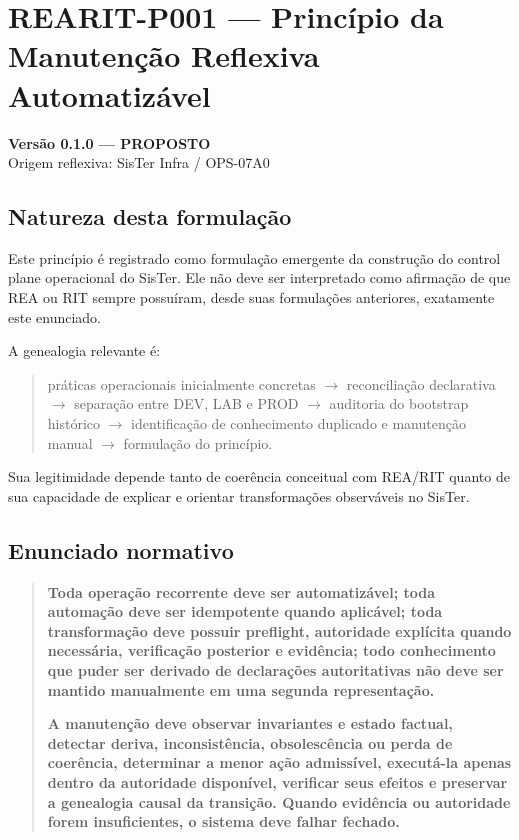 
\chapter{REARIT-P001 --- Princípio da Manutenção Reflexiva Automatizável}

\begin{center}
\textbf{Versão 0.1.0 --- PROPOSTO}\\
Origem reflexiva: SisTer Infra / OPS-07A0
\end{center}

\section{Natureza desta formulação}

Este princípio é registrado como formulação emergente da construção do control
plane operacional do SisTer. Ele não deve ser interpretado como afirmação de
que REA ou RIT sempre possuíram, desde suas formulações anteriores, exatamente
este enunciado.

A genealogia relevante é:

\begin{quote}
práticas operacionais inicialmente concretas
$\rightarrow$
reconciliação declarativa
$\rightarrow$
separação entre DEV, LAB e PROD
$\rightarrow$
auditoria do bootstrap histórico
$\rightarrow$
identificação de conhecimento duplicado e manutenção manual
$\rightarrow$
formulação do princípio.
\end{quote}

Sua legitimidade depende tanto de coerência conceitual com REA/RIT quanto de
sua capacidade de explicar e orientar transformações observáveis no SisTer.

\section{Enunciado normativo}

\begin{quote}
\textbf{Toda operação recorrente deve ser automatizável; toda automação deve ser
idempotente quando aplicável; toda transformação deve possuir preflight,
autoridade explícita quando necessária, verificação posterior e evidência; todo
conhecimento que puder ser derivado de declarações autoritativas não deve ser
mantido manualmente em uma segunda representação.}

\medskip

\textbf{A manutenção deve observar invariantes e estado factual, detectar
deriva, inconsistência, obsolescência ou perda de coerência, determinar a menor
ação admissível, executá-la apenas dentro da autoridade disponível, verificar
seus efeitos e preservar a genealogia causal da transição. Quando evidência ou
autoridade forem insuficientes, o sistema deve falhar fechado.}
\end{quote}


